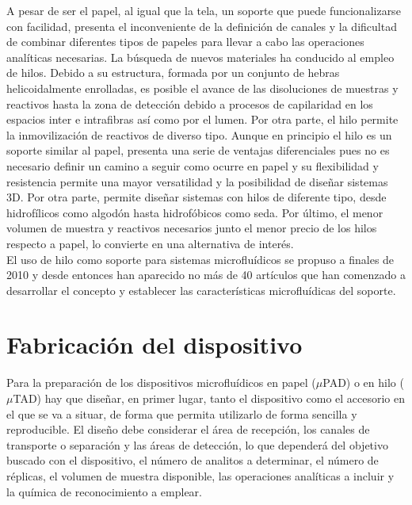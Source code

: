 \documentclass{article}
\begin{document}
A pesar de ser el papel, al igual que la tela, un soporte que puede funcionalizarse con facilidad, presenta el inconveniente de la definición de canales y la dificultad de combinar diferentes tipos de papeles para llevar a cabo las operaciones analíticas necesarias. La búsqueda de nuevos materiales ha conducido al empleo de hilos. Debido a su estructura, formada por un conjunto de hebras helicoidalmente enrolladas, es posible el avance de las disoluciones de muestras y reactivos hasta la zona de detección debido a procesos de capilaridad en los espacios inter e intrafibras así como por el lumen\cite{Banerjee2013}. Por otra parte, el hilo permite la inmovilización de reactivos de diverso tipo\cite{Lu2015}. Aunque en principio el hilo es un soporte similar al papel, presenta una serie de ventajas diferenciales\cite{Nilghaz2013} pues no es necesario definir un camino a seguir como ocurre en papel y su flexibilidad y resistencia permite una mayor versatilidad y la posibilidad de diseñar sistemas 3D. Por otra parte, permite diseñar sistemas con hilos de diferente tipo, desde hidrofílicos como algodón hasta hidrofóbicos como seda. Por último, el menor volumen de muestra y reactivos necesarios junto el menor precio de los hilos respecto a papel, lo convierte en una alternativa de interés.\\

El uso de hilo como soporte para sistemas microfluídicos se propuso a finales de 2010\cite{Li2010} y desde entonces han aparecido no más de 40 artículos que han comenzado a desarrollar el concepto y establecer las características microfluídicas del soporte\cite{Ballerini2011}.

\section{Fabricación del dispositivo}

Para la preparación de los dispositivos microfluídicos en papel ($\mu$PAD) o en hilo ($\mu$TAD) hay que diseñar, en primer lugar, tanto el dispositivo como el accesorio en el que se va a situar, de forma que permita utilizarlo de forma sencilla y reproducible. El diseño debe considerar el área de recepción, los canales de transporte o separación y las áreas de detección, lo que dependerá del objetivo buscado con el dispositivo, el número de analitos a determinar, el número de réplicas, el volumen de muestra disponible, las operaciones analíticas a incluir y la química de reconocimiento a emplear.\\
\end{document}
